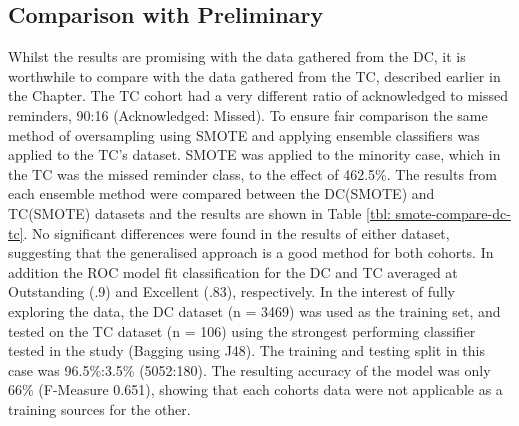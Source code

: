 \subsection{Comparison with Preliminary}
Whilst the results are promising with the data gathered from the DC, it is worthwhile to compare with the data gathered from the TC, described earlier in the Chapter. The TC cohort had a very different ratio of acknowledged to missed reminders, 90:16 (Acknowledged: Missed). To ensure fair comparison the same method of oversampling using SMOTE and applying ensemble classifiers was applied to the TC's dataset. SMOTE was applied to the minority case, which in the TC was the missed reminder class, to the effect of 462.5\%. The results from each ensemble method were compared between the DC(SMOTE) and TC(SMOTE) datasets and the results are shown in Table \ref{tbl: smote-compare-dc-tc}. No significant differences were found in the results of either dataset, suggesting that the generalised approach is a good method for both cohorts. In addition the ROC model fit classification for the DC and TC averaged at Outstanding (.9) and Excellent (.83), respectively. In the interest of fully exploring the data, the DC dataset (n = 3469) was used as the training set, and tested on the TC dataset (n = 106) using the strongest performing classifier tested in the study (Bagging using J48). The training and testing split in this case was 96.5\%:3.5\% (5052:180).
The resulting accuracy of the model was only 66\% (F-Measure 0.651), showing that each cohorts data were not applicable as a training sources for the other.

